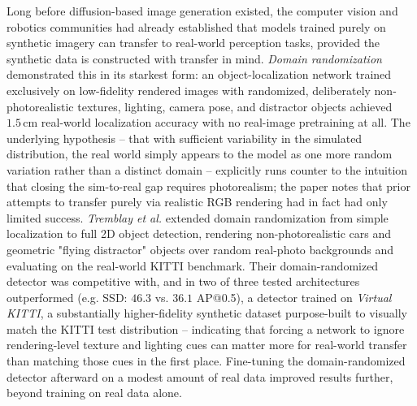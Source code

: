 Long before diffusion-based image generation existed, the computer vision and robotics communities had already established that models trained purely on synthetic imagery can transfer to real-world perception tasks, provided the synthetic data is constructed with transfer in mind. \textit{Domain randomization} \cite{tobinDomainRandomizationTransferring2017} demonstrated this in its starkest form: an object-localization network trained exclusively on low-fidelity rendered images with randomized, deliberately non-photorealistic textures, lighting, camera pose, and distractor objects achieved $1.5\,\mathrm{cm}$ real-world localization accuracy with no real-image pretraining at all. The underlying hypothesis -- that with sufficient variability in the simulated distribution, the real world simply appears to the model as one more random variation rather than a distinct domain -- explicitly runs counter to the intuition that closing the sim-to-real gap requires photorealism; the paper notes that prior attempts to transfer purely via realistic RGB rendering had in fact had only limited success. \textit{Tremblay et al.} \cite{tremblayTrainingDeepNetworks2018} extended domain randomization from simple localization to full 2D object detection, rendering non-photorealistic cars and geometric "flying distractor" objects over random real-photo backgrounds and evaluating on the real-world KITTI benchmark. Their domain-randomized detector was competitive with, and in two of three tested architectures outperformed (e.g. SSD: $46.3$ vs. $36.1$ AP@0.5), a detector trained on \textit{Virtual KITTI}, a substantially higher-fidelity synthetic dataset purpose-built to visually match the KITTI test distribution -- indicating that forcing a network to ignore rendering-level texture and lighting cues can matter more for real-world transfer than matching those cues in the first place. Fine-tuning the domain-randomized detector afterward on a modest amount of real data improved results further, beyond training on real data alone.

